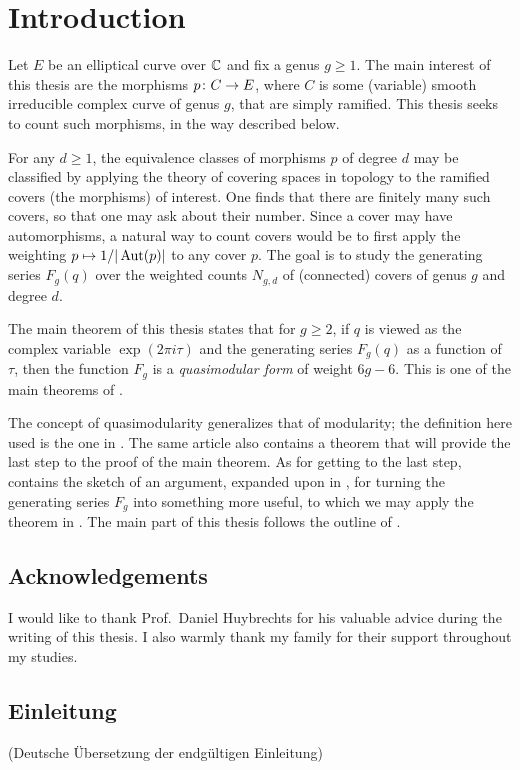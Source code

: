 \section{Introduction}
Let $E$ be an elliptical curve over $\mathbb{C}$ and fix a genus $g\geq 1$.
The main interest of this thesis are the morphisms $p\colon C\to E$, where $C$ is some (variable) smooth irreducible complex curve of genus $g$, that are simply ramified. This thesis seeks to count such morphisms, in the way described below.

For any $d\geq 1$, the equivalence classes of morphisms $p$ of degree $d$ may be classified by applying the theory of covering spaces in topology to the ramified covers (\ie the morphisms) of interest.
One finds that there are finitely many such covers, so that one may ask about their number. Since a cover may have automorphisms, a natural way to count covers would be to first apply the weighting $p\mapsto 1/|\operatorname{Aut}(p)|$ to any cover $p$.
The goal is to study the generating series $F_g(q)$ over the weighted counts $N_{g,d}$ of (connected) covers of genus $g$ and degree $d$.

The main theorem of this thesis states that for $g\geq 2$, if $q$ is viewed as the complex variable $\exp(2\pi i\tau)$ and the generating series $F_g(q)$ as a function of $\tau$, then the function $F_g$ is a \emph{quasimodular form} of weight $6g-6$. This is one of the main theorems of \cite{Dijkgraaf}.

The concept of quasimodularity generalizes that of modularity; the definition here used is the one in \cite{Kaneko-Zagier1995}. The same article also contains a theorem that will provide the last step to the proof of the main theorem. As for getting to the last step, \cite{Dijkgraaf} contains the sketch of an argument, expanded upon in \cite{Roth}, for turning the generating series $F_g$ into something more useful, \ie to which we may apply the theorem in \cite{Kaneko-Zagier1995}. The main part of this thesis follows the outline of \cite{Roth}.
\subsection*{Acknowledgements}
I would like to thank Prof.\ Daniel Huybrechts for his valuable advice during the writing of this thesis. I also warmly thank my family for their support throughout my studies.
\fi

\subsection*{Einleitung}

(Deutsche Übersetzung der endgültigen Einleitung)